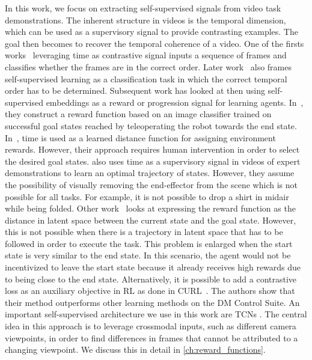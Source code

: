 \documentclass[\home/main.tex]{subfiles}
\begin{document}
In this work, we focus on extracting self-supervised signals from video task demonstrations. The inherent structure in videos is the temporal dimension, which can be used as a supervisory signal to provide contrasting examples. The goal then becomes to recover the temporal coherence of a video. One of the firsts works~\cite{Misra2016} leveraging time as contrastive signal inputs a sequence of frames and classifies whether the frames are in the correct order. Later work~\cite{Lee2017,Fernando2017} also frames self-supervised learning as a classification task in which the correct temporal order has to be determined. Subsequent work has looked at then using self-supervised embeddings as a reward or progression signal for learning agents.
In~\cite{Singh2019}, they construct a reward function based on an image classifier trained on successful goal states reached by teleoperating the robot towards the end state. In~\cite{Hartikainen2019}, time is used as a learned distance function for assigning environment rewards. However, their approach requires human intervention in order to select the desired goal states. \cite{Nair2018time} also uses time as a supervisory signal in videos of expert demonstrations to learn an optimal trajectory of states. However, they assume the possibility of visually removing the end-effector from the scene which is not possible for all tasks. For example, it is not possible to drop a shirt in midair while being folded. Other work~\cite{Nair2018visual} looks at expressing the reward function as the distance in latent space between the current state and the goal state. However, this is not possible when there is a trajectory in latent space that has to be followed in order to execute the task. This problem is enlarged when the start state is very similar to the end state. In this scenario, the agent would not be incentivized to leave the start state because it already receives high rewards due to being close to the end state. %
Alternatively, it is possible to add a contrastive loss as an auxiliary objective in RL as done in CURL~\cite{Srinivas2020CURL}. The authors show that their method outperforms other learning methods on the DM Control Suite.
An important self-supervised architecture we use in this work are \glspl{TCN} \autocite{Sermanet2017TCN}. The central idea in this approach is to leverage crossmodal inputs, such as different camera viewpoints, in order to find differences in frames that cannot be attributed to a changing viewpoint. We discuss this in detail in \cref{ch:reward_functions}.
\end{document}
